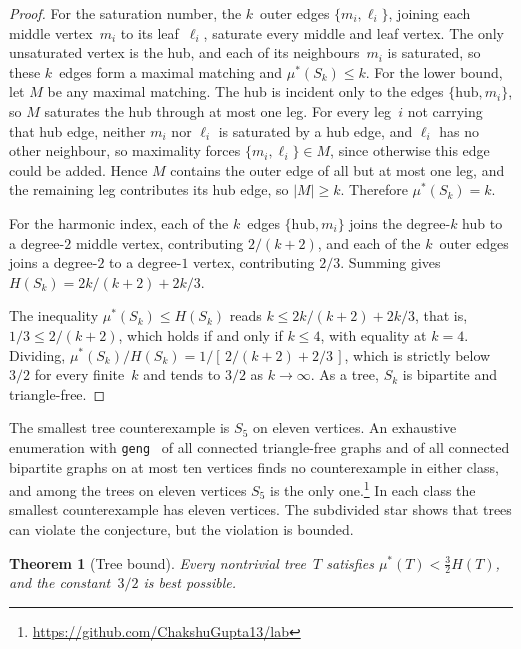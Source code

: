 \documentclass[11pt]{article}
\newtheorem{theorem}{Theorem}
\theoremstyle{definition}
\theoremstyle{remark}
\newcommand{\mustar}{\mu^{*}}
\begin{document}
\begin{proof}
For the saturation number, the $k$~outer edges $\{m_i, \ell_i\}$, joining
each middle vertex~$m_i$ to its leaf~$\ell_i$, saturate every middle and leaf
vertex.  The only unsaturated vertex is the hub, and each of its
neighbours~$m_i$ is saturated, so these $k$~edges form a maximal matching and
$\mustar(S_k) \le k$.  For the lower bound, let $M$ be any maximal matching.
The hub is incident only to the edges $\{\text{hub}, m_i\}$, so $M$ saturates
the hub through at most one leg.  For every leg~$i$ not carrying that hub
edge, neither $m_i$ nor $\ell_i$ is saturated by a hub edge, and $\ell_i$ has
no other neighbour, so maximality forces $\{m_i, \ell_i\} \in M$, since
otherwise this edge could be added.  Hence $M$ contains the outer edge of
all but at most one leg, and the remaining leg contributes its hub edge, so
$|M| \ge k$.  Therefore $\mustar(S_k) = k$.

For the harmonic index, each of the $k$~edges $\{\text{hub}, m_i\}$ joins the
degree-$k$ hub to a degree-$2$ middle vertex, contributing $2/(k+2)$, and
each of the $k$~outer edges joins a degree-$2$ to a degree-$1$ vertex,
contributing $2/3$.  Summing gives $H(S_k) = 2k/(k+2) + 2k/3$.

The inequality $\mustar(S_k) \le H(S_k)$ reads
$k \le 2k/(k+2) + 2k/3$, that is, $1/3 \le 2/(k+2)$, which holds if and only
if $k \le 4$, with equality at $k = 4$.  Dividing,
$\mustar(S_k)/H(S_k) = 1/[\,2/(k+2) + 2/3\,]$, which is strictly below $3/2$
for every finite~$k$ and tends to $3/2$ as $k \to \infty$.  As a tree, $S_k$
is bipartite and triangle-free.
\end{proof}

The smallest tree counterexample is $S_5$ on eleven vertices.  An exhaustive
enumeration with \texttt{geng}~\cite{McKay2014nauty} of all connected
triangle-free graphs and of all connected bipartite graphs on at most ten
vertices finds no counterexample in either class, and among the trees on
eleven vertices $S_5$ is the
only one.\footnote{\url{https://github.com/ChakshuGupta13/lab}}  In each class
the smallest counterexample has eleven vertices. The subdivided star shows that trees can violate the conjecture, but the
violation is bounded.

\begin{theorem}[Tree bound]\label{thm:treebound}
Every nontrivial tree~$T$ satisfies $\mustar(T) < \tfrac{3}{2} H(T)$, and the
constant~$3/2$ is best possible.
\end{theorem}
\end{document}
